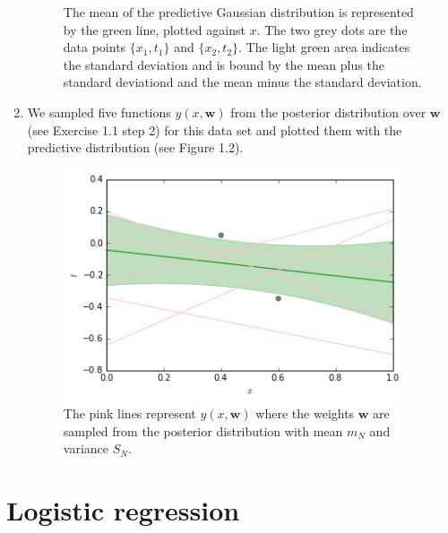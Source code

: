 \documentclass[a4paper,10pt]{article}
\numberwithin{equation}{section} %
\numberwithin{figure}{section} %
\numberwithin{table}{section} %
\theoremstyle{mytheor}
\begin{document}
\begin{enumerate}
\begin{figure}[h]
   			\caption{\vspace{-0.1cm} The mean of the predictive Gaussian distribution is represented by the green line, plotted against $x$. \vspace{-0.1cm}The two grey dots are the data points $\{x_1,t_1\}$ and $\{x_2,t_2\}$. The light green area indicates the standard deviation and is bound by the mean plus the standard deviationd and the mean minus the standard deviation.}\vspace{-0.2cm}
  		\end{figure}
	\item We sampled five functions $y(x, \boldsymbol{w})$ from the posterior distribution over $\boldsymbol{w}$ (see Exercise 1.1 step 2) for this data set and plotted them with the predictive distribution (see Figure 1.2). 
		\begin{figure}[h!]
   			\centering
   			\includegraphics[width=0.95\textwidth]{exercise1plotta.png}\vspace{-0.4cm}
   			\caption{\vspace{-0.0cm} The pink lines represent $y(x,\boldsymbol{w})$ where the weights $\boldsymbol{w}$ are sampled from the posterior distribution with mean $m_N$ and variance $S_N$.}
  		\end{figure}
\end{enumerate}

\vfill 

\section{Logistic regression}
\end{document}
